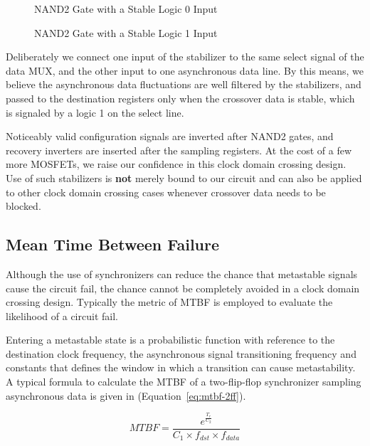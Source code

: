 \documentclass[12pt]{article}
\newcommand{\refeq}[1]{(Equation~\ref{#1})}
\begin{document}
\begin{figure}[ht]
\centering

\caption{NAND2 Gate with a Stable Logic 0 Input}
\label{fig:nand2-in0}
\end{figure}

\begin{figure}[ht]
\centering

\caption{NAND2 Gate with a Stable Logic 1 Input}
\label{fig:nand2-in1}
\end{figure}

Deliberately we connect one input of the stabilizer to the same select signal
of the data MUX, and the other input to one asynchronous data line. By this
means, we believe the asynchronous data fluctuations are well filtered by the
stabilizers, and passed to the destination registers only when the crossover
data is stable, which is signaled by a logic 1 on the select line.

Noticeably valid configuration signals are inverted after NAND2 gates, and
recovery inverters are inserted after the sampling registers. At the cost of a
few more MOSFETs, we raise our confidence in this clock domain crossing design.
Use of such stabilizers is \textbf{not} merely bound to our circuit and can
also be applied to other clock domain crossing cases whenever crossover data
needs to be blocked.

\subsection{Mean Time Between Failure} \label{mtbf}
Although the use of synchronizers can reduce the chance that
metastable signals cause the circuit fail, the chance cannot be completely
avoided in a clock domain crossing design. Typically the metric of MTBF
is employed to evaluate the likelihood of a circuit fail.

Entering a metastable state is a probabilistic function with reference to the
destination clock frequency, the asynchronous signal transitioning frequency
and constants that defines the window in which a transition can cause
metastability. A typical formula \cite{altera2009wp} \cite{cadence2004tp}
\cite{chen2010fpga} \cite{dike1999miller} to calculate the MTBF of a
two-flip-flop synchronizer sampling asynchronous data is given in
\refeq{eq:mtbf-2ff}.

\begin{equation} \label{eq:mtbf-2ff}
MTBF = \frac{e^{\frac{T_r}{C_2}}} {C_1 \times f_{dst} \times f_{data}}
\end{equation}
\end{document}
